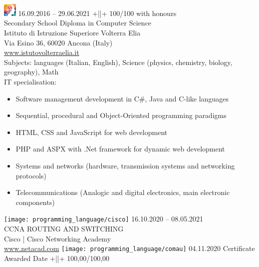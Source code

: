 \documentclass[letterpaper, 11pt]{article}
\begin{document}
\hfill\break
\includegraphics[width=1.7em]{logo/iisve}
16.09.2016 – 29.06.2021 +||+ 100/100 with honours \\
Secondary School Diploma in Computer Science\\
Istituto di Istruzione Superiore Volterra Elia\\
Via Esino 36, 60020 Ancona (Italy)\\
\href{https://www.istitutovolterraelia.it/}
{\textcolor{linked}{www.istutovolterraelia.it}}\\
Subjects: languages (Italian, English), Science (physics, chemistry, biology, geography), Math \\
IT specialisation:
\vspace{-0.7em}
\begin{itemize}
    \setlength{\itemsep}{1.2pt}
    \setlength{\parskip}{0.2pt}
    \setlength{\parsep}{0pt}
    \item Software management development in C\#, Java and C-like languages
    \item Sequential, procedural and Object-Oriented programming paradigms
    \item HTML, CSS and JavaScript for web development
    \item PHP and ASPX with .Net framework for dynamic web development
    \item Systems and networks (hardware, transmission systems and networking protocols)
    \item Telecommunications (Analogic and digital electronics, main electronic components)
\end{itemize}
\vspace*{-0.8em}
\hfill\break
\texttt{[image: programming\_language/cisco]}
16.10.2020 – 08.05.2021\\
CCNA ROUTING AND SWITCHING\\
Cisco | Cisco Networking Academy\\
\href{https://www.netacad.com/}
{\textcolor{linked}{www.netacad.com}}
\bigskip\newline
\texttt{[image: programming\_language/comau]}
04.11.2020 Certificate Awarded Date +||+ 100,00/100,00 \\
\end{document}
